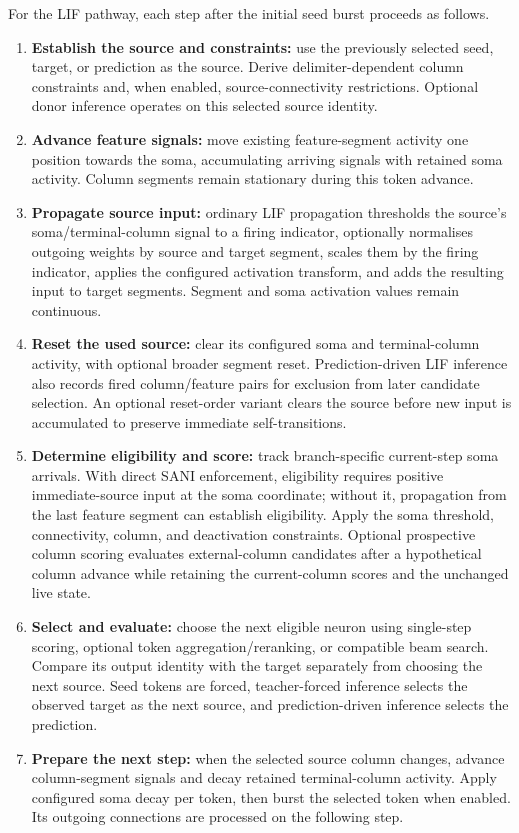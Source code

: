 For the LIF pathway, each step after the initial seed burst proceeds as follows.
\begin{enumerate}
	\item \textbf{Establish the source and constraints:} use the previously selected seed, target, or prediction as the source. Derive delimiter-dependent column constraints and, when enabled, source-connectivity restrictions. Optional donor inference operates on this selected source identity.
	\item \textbf{Advance feature signals:} move existing feature-segment activity one position towards the soma, accumulating arriving signals with retained soma activity. Column segments remain stationary during this token advance.
	\item \textbf{Propagate source input:} ordinary LIF propagation thresholds the source's soma/terminal-column signal to a firing indicator, optionally normalises outgoing weights by source and target segment, scales them by the firing indicator, applies the configured activation transform, and adds the resulting input to target segments. Segment and soma activation values remain continuous.
	\item \textbf{Reset the used source:} clear its configured soma and terminal-column activity, with optional broader segment reset. Prediction-driven LIF inference also records fired column/feature pairs for exclusion from later candidate selection. An optional reset-order variant clears the source before new input is accumulated to preserve immediate self-transitions.
	\item \textbf{Determine eligibility and score:} track branch-specific current-step soma arrivals. With direct SANI enforcement, eligibility requires positive immediate-source input at the soma coordinate; without it, propagation from the last feature segment can establish eligibility. Apply the soma threshold, connectivity, column, and deactivation constraints. Optional prospective column scoring evaluates external-column candidates after a hypothetical column advance while retaining the current-column scores and the unchanged live state.
	\item \textbf{Select and evaluate:} choose the next eligible neuron using single-step scoring, optional token aggregation/reranking, or compatible beam search. Compare its output identity with the target separately from choosing the next source. Seed tokens are forced, teacher-forced inference selects the observed target as the next source, and prediction-driven inference selects the prediction.
	\item \textbf{Prepare the next step:} when the selected source column changes, advance column-segment signals and decay retained terminal-column activity. Apply configured soma decay per token, then burst the selected token when enabled. Its outgoing connections are processed on the following step.
\end{enumerate}

